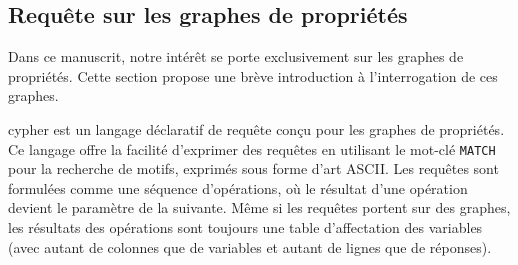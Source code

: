 \subsection{Requête sur les graphes de propriétés}
Dans ce manuscrit, notre intérêt se porte exclusivement sur les graphes de propriétés.
Cette section propose une brève introduction à l'interrogation de ces graphes.

\gls{cypher} est un langage déclaratif de requête conçu pour les graphes de propriétés.
Ce langage offre la facilité d'exprimer des requêtes en utilisant le mot-clé \verb|MATCH| pour la recherche de motifs, exprimés sous forme d'art ASCII.
Les requêtes sont formulées comme une séquence d'opérations, où le résultat d'une opération devient le paramètre de la suivante.
Même si les requêtes portent sur des graphes, les résultats des opérations sont toujours une table d'affectation des variables (avec autant de colonnes que de variables et autant de lignes que de réponses).

